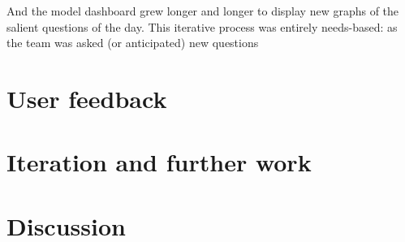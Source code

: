 And the model dashboard grew longer and longer to display new graphs of the salient questions of the day. This iterative process was entirely needs-based: as the team was asked (or anticipated) new questions

\hypertarget{user-feedback}{%
\section{User feedback}\label{user-feedback}}

\hypertarget{iteration-and-further-work}{%
\section{Iteration and further work}\label{iteration-and-further-work}}

\hypertarget{discussion}{%
\section{Discussion}\label{discussion}}
